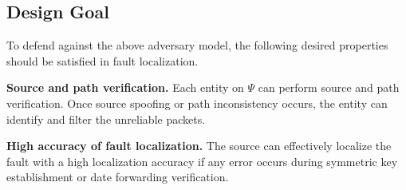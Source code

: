 \subsection{Design Goal}
\label{desiredproperties}
To defend against the above adversary model, the following desired properties should be satisfied in fault localization. 

\noindent\textbf{Source and path verification.} Each entity on $\Psi$ can perform source and path verification. Once source spoofing or path inconsistency occurs, the entity can identify and filter the unreliable packets. 

\noindent\textbf{High accuracy of fault localization.} The source can effectively localize the fault with a high localization accuracy if any error occurs during symmetric key establishment or date forwarding verification. 

